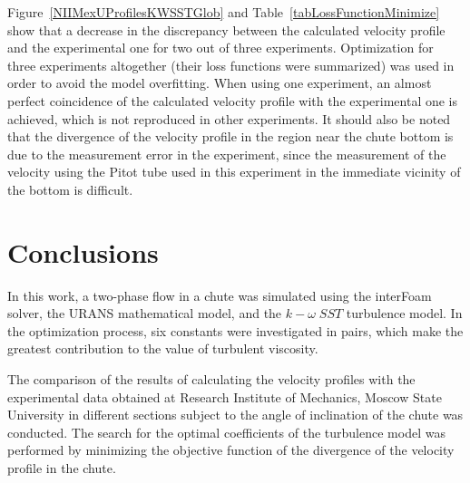 \documentclass[sensors,article,submit,moreauthors,pdftex]{Definitions/mdpi}
\begin{document}
\begin{paracol}{2}
Figure~\ref{NIIMexUProfilesKWSSTGlob} and Table~\ref{tabLossFunctionMinimize} show that a decrease in the discrepancy between the calculated velocity profile and the experimental one for two out of three experiments. Optimization for three experiments altogether (their loss functions were summarized) was used in order to avoid the model overfitting. When using one experiment, an almost perfect coincidence of the calculated velocity profile with the experimental one is achieved, which is not reproduced in other experiments. It should also be noted that the divergence of the velocity profile in the region near the chute bottom is due to the measurement error in the experiment, since the measurement of the velocity using the Pitot tube used in this experiment in the immediate vicinity of the bottom is difficult.


\section{Conclusions}

In this work, a two-phase flow in a chute was simulated using the interFoam solver, the URANS mathematical model, and the $k-\omega \; SST$ turbulence model. In the optimization process, six constants were investigated in pairs, which make the greatest contribution to the value of turbulent viscosity.

The comparison of the results of calculating the velocity profiles with the experimental data obtained at Research Institute of Mechanics, Moscow State University in different sections subject to the angle of inclination of the chute was conducted. The search for the optimal coefficients of the turbulence model was performed by minimizing the objective function of the divergence of the velocity profile in the chute. %


\end{paracol}
\end{document}
